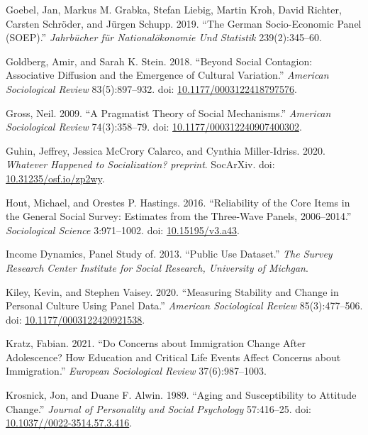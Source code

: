 \documentclass[
  11pt,
]{article}
\newlength{\cslhangindent}
\newenvironment{CSLReferences}[2] %
 {\begin{list}{}{%
  \setlength{\itemindent}{0pt}
  \setlength{\leftmargin}{0pt}
  \setlength{\parsep}{0pt}
  \ifodd #1
   \setlength{\leftmargin}{\cslhangindent}
   \setlength{\itemindent}{-1\cslhangindent}
  \fi
  \setlength{\itemsep}{#2\baselineskip}}}
 {\end{list}}
\begin{document}
\begin{CSLReferences}{1}{1}
Goebel, Jan, Markus M. Grabka, Stefan Liebig, Martin Kroh, David
Richter, Carsten Schröder, and Jürgen Schupp. 2019. {``The German
Socio-Economic Panel (SOEP).''} \emph{Jahrb{ü}cher f{ü}r
National{ö}konomie Und Statistik} 239(2):345--60.

Goldberg, Amir, and Sarah K. Stein. 2018. {``Beyond {Social}
{Contagion}: {Associative} {Diffusion} and the {Emergence} of {Cultural}
{Variation}.''} \emph{American Sociological Review} 83(5):897--932. doi:
\href{https://doi.org/10.1177/0003122418797576}{10.1177/0003122418797576}.

Gross, Neil. 2009. {``A {Pragmatist} {Theory} of {Social}
{Mechanisms}.''} \emph{American Sociological Review} 74(3):358--79. doi:
\href{https://doi.org/10.1177/000312240907400302}{10.1177/000312240907400302}.

Guhin, Jeffrey, Jessica McCrory Calarco, and Cynthia Miller-Idriss.
2020. \emph{Whatever {Happened} to {Socialization}?} \emph{preprint}.
SocArXiv. doi:
\href{https://doi.org/10.31235/osf.io/zp2wy}{10.31235/osf.io/zp2wy}.

Hout, Michael, and Orestes P. Hastings. 2016. {``Reliability of the
{Core} {Items} in the {General} {Social} {Survey}: {Estimates} from the
{Three}-{Wave} {Panels}, 2006--2014.''} \emph{Sociological Science}
3:971--1002. doi:
\href{https://doi.org/10.15195/v3.a43}{10.15195/v3.a43}.

Income Dynamics, Panel Study of. 2013. {``Public Use Dataset.''}
\emph{The Survey Research Center Institute for Social Research,
University of Michgan}.

Kiley, Kevin, and Stephen Vaisey. 2020. {``Measuring {Stability} and
{Change} in {Personal} {Culture} {Using} {Panel} {Data}.''}
\emph{American Sociological Review} 85(3):477--506. doi:
\href{https://doi.org/10.1177/0003122420921538}{10.1177/0003122420921538}.

Kratz, Fabian. 2021. {``Do Concerns about Immigration Change After
Adolescence? How Education and Critical Life Events Affect Concerns
about Immigration.''} \emph{European Sociological Review}
37(6):987--1003.

Krosnick, Jon, and Duane F. Alwin. 1989. {``Aging and {Susceptibility}
to {Attitude} {Change}.''} \emph{Journal of Personality and Social
Psychology} 57:416--25. doi:
\href{https://doi.org/10.1037//0022-3514.57.3.416}{10.1037//0022-3514.57.3.416}.


\end{CSLReferences}
\end{document}
